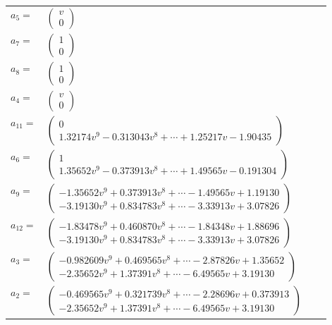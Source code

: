 \documentclass[1p]{elsarticle_modified}
\theoremstyle{definition}
\begin{document}
\begin{tabular}{m{7pt} m{180pt} m{7pt} m{180pt} }
\flushright $a_{5}=$&$\begin{pmatrix}v\\0\end{pmatrix}$ \\
\flushright $a_{7}=$&$\begin{pmatrix}1\\0\end{pmatrix}$ \\
\flushright $a_{8}=$&$\begin{pmatrix}1\\0\end{pmatrix}$ \\
\flushright $a_{4}=$&$\begin{pmatrix}v\\0\end{pmatrix}$ \\
\flushright $a_{11}=$&$\begin{pmatrix}0\\1.32174 v^{9}-0.313043 v^{8}+\cdots+1.25217 v-1.90435\end{pmatrix}$ \\
\flushright $a_{6}=$&$\begin{pmatrix}1\\1.35652 v^{9}-0.373913 v^{8}+\cdots+1.49565 v-0.191304\end{pmatrix}$ \\
\flushright $a_{9}=$&$\begin{pmatrix}-1.35652 v^{9}+0.373913 v^{8}+\cdots-1.49565 v+1.19130\\-3.19130 v^{9}+0.834783 v^{8}+\cdots-3.33913 v+3.07826\end{pmatrix}$ \\
\flushright $a_{12}=$&$\begin{pmatrix}-1.83478 v^{9}+0.460870 v^{8}+\cdots-1.84348 v+1.88696\\-3.19130 v^{9}+0.834783 v^{8}+\cdots-3.33913 v+3.07826\end{pmatrix}$ \\
\flushright $a_{3}=$&$\begin{pmatrix}-0.982609 v^{9}+0.469565 v^{8}+\cdots-2.87826 v+1.35652\\-2.35652 v^{9}+1.37391 v^{8}+\cdots-6.49565 v+3.19130\end{pmatrix}$ \\
\flushright $a_{2}=$&$\begin{pmatrix}-0.469565 v^{9}+0.321739 v^{8}+\cdots-2.28696 v+0.373913\\-2.35652 v^{9}+1.37391 v^{8}+\cdots-6.49565 v+3.19130\end{pmatrix}$ \\

\end{tabular}
\end{document}
